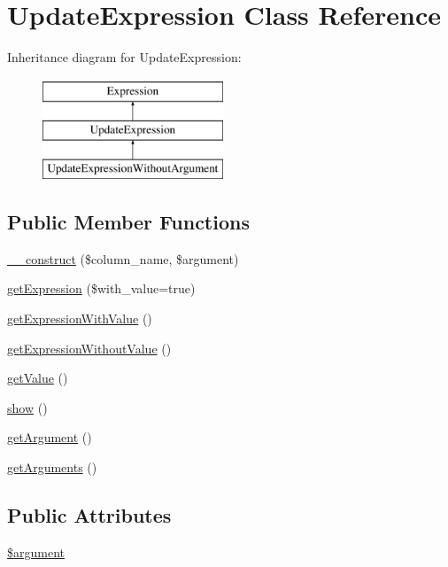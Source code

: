 \hypertarget{classUpdateExpression}{\section{Update\-Expression Class Reference}
\label{classUpdateExpression}
}
Inheritance diagram for Update\-Expression\-:\begin{figure}[H]
\begin{center}
\leavevmode
\includegraphics[height=3.000000cm]{classUpdateExpression}
\end{center}
\end{figure}
\subsection*{Public Member Functions}
\begin{DoxyCompactItemize}
\item 
\hyperlink{classUpdateExpression_a3c3c0b6c162074ac97383b56cd22999d}{\-\_\-\-\_\-construct} (\$column\-\_\-name, \$argument)
\item 
\hyperlink{classUpdateExpression_a1824b01ff4d35cec7d284fcd192d1c58}{get\-Expression} (\$with\-\_\-value=true)
\item 
\hyperlink{classUpdateExpression_abf5aa8ed9c023906f684c31ef735ecd6}{get\-Expression\-With\-Value} ()
\item 
\hyperlink{classUpdateExpression_a91fc65199f195dd3c5ef96a6328b7554}{get\-Expression\-Without\-Value} ()
\item 
\hyperlink{classUpdateExpression_a56d4244ba753a420fc8b6db3b10fc9f9}{get\-Value} ()
\item 
\hyperlink{classUpdateExpression_a3d3ea00a85cdf7e086139e4544e757e0}{show} ()
\item 
\hyperlink{classUpdateExpression_a86d860d80b3053bd4bcff511160aca3b}{get\-Argument} ()
\item 
\hyperlink{classUpdateExpression_a898b47f8e6a8191fd75143d402884b02}{get\-Arguments} ()
\end{DoxyCompactItemize}
\subsection*{Public Attributes}
\begin{DoxyCompactItemize}
\item 
\hyperlink{classUpdateExpression_a5ad6b27dd8458bfdd8317006ec1c5983}{\$argument}
\end{DoxyCompactItemize}


